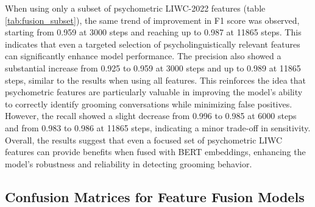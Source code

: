 When using only a subset of psychometric LIWC-2022 features (table \ref{tab:fusion_subset}), the same trend of improvement in F1 score was observed, starting from 0.959 at 3000 steps and reaching up to 0.987 at 11865 steps. This indicates that even a targeted  selection of psycholinguistically relevant features can significantly enhance model performance. The precision also showed a substantial increase from 0.925 to 0.959 at 3000 steps and up to 0.989 at 11865 steps, similar to the results when using all features. This reinforces the idea that psychometric features are particularly valuable in improving the model's ability to correctly identify grooming conversations while minimizing false positives. However, the recall showed a slight decrease from 0.996 to 0.985 at 6000 steps and from 0.983 to 0.986 at 11865 steps, indicating a minor trade-off in sensitivity. Overall, the results suggest that even a focused set of psychometric LIWC features can provide benefits when fused with BERT embeddings, enhancing the model's robustness and reliability in detecting grooming behavior.


\subsection{Confusion Matrices for Feature Fusion Models}


